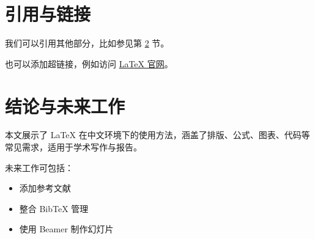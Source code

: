 \documentclass[12pt]{article}
\begin{document}
\section{引用与链接}
我们可以引用其他部分，比如参见第 \ref{sec:conclusion} 节。

也可以添加超链接，例如访问 \href{https://www.latex-project.org}{LaTeX 官网}。

\section{结论与未来工作} \label{sec:conclusion}
本文展示了 LaTeX 在中文环境下的使用方法，涵盖了排版、公式、图表、代码等常见需求，适用于学术写作与报告。

未来工作可包括：
\begin{itemize}
    \item 添加参考文献
    \item 整合 BibTeX 管理
    \item 使用 Beamer 制作幻灯片
\end{itemize}
\end{document}
